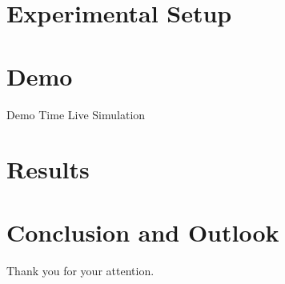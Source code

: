 \documentclass[final]{beamer}
\begin{document}
\section{Experimental Setup}



\section{Demo}

\begin{frame}[t]{Demo Time}{}
  \centering
  \vfill
  {\Huge Live Simulation}
  \vfill
\end{frame}

\section{Results}



\section{Conclusion and Outlook}




\begin{frame}[titleimagenofooter]{}{}
  \centering
  Thank you for your attention.
\end{frame}


\end{document}
